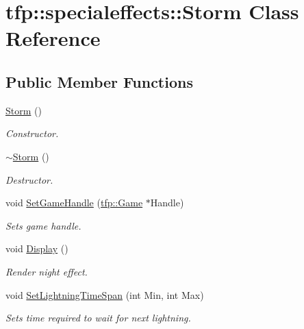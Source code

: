 \hypertarget{classtfp_1_1specialeffects_1_1_storm}{}\section{tfp\+:\+:specialeffects\+:\+:Storm Class Reference}
\label{classtfp_1_1specialeffects_1_1_storm}
\subsection*{Public Member Functions}
\begin{DoxyCompactItemize}
\item 
\mbox{\label{classtfp_1_1specialeffects_1_1_storm_a041b15b5d011821fd6c8b1a9648d1f82}} 
\mbox{\hyperlink{classtfp_1_1specialeffects_1_1_storm_a041b15b5d011821fd6c8b1a9648d1f82}{Storm}} ()
\begin{DoxyCompactList}\small\item\em Constructor. \end{DoxyCompactList}\item 
\mbox{\label{classtfp_1_1specialeffects_1_1_storm_a310e82d9be8e8d4e7ac60c35d480eec3}} 
\mbox{\hyperlink{classtfp_1_1specialeffects_1_1_storm_a310e82d9be8e8d4e7ac60c35d480eec3}{$\sim$\+Storm}} ()
\begin{DoxyCompactList}\small\item\em Destructor. \end{DoxyCompactList}\item 
\mbox{\label{classtfp_1_1specialeffects_1_1_storm_ad6a08b303d1129c2227800fc3ba9fb4a}} 
void \mbox{\hyperlink{classtfp_1_1specialeffects_1_1_storm_ad6a08b303d1129c2227800fc3ba9fb4a}{Set\+Game\+Handle}} (\mbox{\hyperlink{classtfp_1_1_game}{tfp\+::\+Game}} $\ast$Handle)
\begin{DoxyCompactList}\small\item\em Sets game handle. \end{DoxyCompactList}\item 
void \mbox{\hyperlink{classtfp_1_1specialeffects_1_1_storm_a7738c13805a19b1146b1f77c5e5f4886}{Display}} ()
\begin{DoxyCompactList}\small\item\em Render night effect. \end{DoxyCompactList}\item 
\mbox{\label{classtfp_1_1specialeffects_1_1_storm_ac08dfba45a45bcc6d18a234a202f3b30}} 
void \mbox{\hyperlink{classtfp_1_1specialeffects_1_1_storm_ac08dfba45a45bcc6d18a234a202f3b30}{Set\+Lightning\+Time\+Span}} (int Min, int Max)
\begin{DoxyCompactList}\small\item\em Sets time required to wait for next lightning. \end{DoxyCompactList}\end{DoxyCompactItemize}


